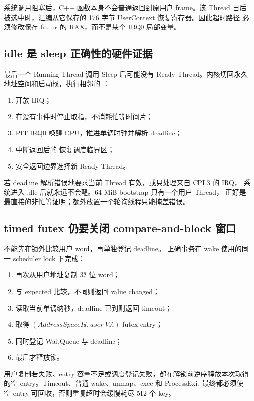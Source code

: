 系统调用阻塞后，C++ 函数本身不会普通返回到原用户 frame。该 Thread 日后
被选中时，汇编从它保存的 176 字节 UserContext 恢复寄存器。因此超时路径
必须修改保存 frame 的 RAX，而不是某个 IRQ0 局部变量。

\subsection{idle 是 sleep 正确性的硬件证据}

最后一个 Running Thread 调用 Sleep 后可能没有 Ready Thread。内核切回永久
地址空间和启动栈，执行相邻的 ：

\begin{enumerate}
  \item {} 开放 IRQ；
  \item {} 在没有事件时停止取指，不消耗忙等时间片；
  \item PIT IRQ0 唤醒 CPU，推进单调时钟并解析 deadline；
  \item 中断返回后的  恢复调度临界区；
  \item 安全返回边界选择新 Ready Thread。
\end{enumerate}

若 deadline 解析错误地要求当前 Thread 有效，或只处理来自 CPL3 的 IRQ，
系统进入 idle 后就永远不会醒。64 MiB bootstrap 只有一个用户 Thread，
正好是最直接的非忙等证明；额外放置一个轮询线程只能掩盖错误。

\subsection{timed futex 仍要关闭 compare-and-block 窗口}

 不能先在锁外比较用户 word，再单独登记 deadline。
正确事务在 wake 使用的同一 scheduler lock 下完成：

\begin{enumerate}
  \item 再次从用户地址复制 32 位 word；
  \item 与 expected 比较，不同则返回 value changed；
  \item 读取当前单调纳秒，deadline 已到则返回 timeout；
  \item 取得 \((AddressSpaceId,user\ VA)\) futex entry；
  \item 同时登记 WaitQueue 与 deadline；
  \item 最后才释放锁。
\end{enumerate}

用户复制若失败、entry 容量不足或调度登记失败，都在解锁前逆序释放本次取得
的空 entry。Timeout、普通 wake、unmap、exec 和 ProcessExit 最终都必须使
空 entry 可回收，否则重复超时会缓慢耗尽 512 个 key。

